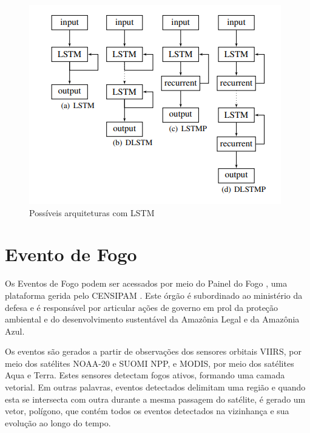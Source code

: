 \begin{figure}[htb]
	\centering
	\begin{minipage}{0.6\linewidth}
		\centering
		\includegraphics[width=\linewidth]{tg1/figuras/lstm_arch.png}
		\caption{Possíveis arquiteturas com LSTM
            \cite{lstm_fig}} \label{fig:lstmarch}
	\end{minipage}
\end{figure}



\section{Evento de Fogo}

Os Eventos de Fogo podem ser acessados por meio do Painel do Fogo \cite{painel-fogo}, uma plataforma gerida pelo CENSIPAM \cite{censipam}. Este órgão é subordinado ao ministério da defesa e é responsável por articular ações de governo em prol da proteção ambiental e do desenvolvimento sustentável da Amazônia Legal e da Amazônia Azul.

Os eventos são gerados a partir de observações dos sensores orbitais VIIRS, por meio dos satélites NOAA-20 e SUOMI NPP, e MODIS, por meio dos satélites Aqua e Terra. Estes sensores detectam fogos ativos, formando uma camada vetorial. Em outras palavras, eventos detectados delimitam uma região e quando esta se intersecta com outra durante a mesma passagem do satélite, é gerado um vetor, polígono, que contém todos os eventos detectados na vizinhança e sua evolução ao longo do tempo.


